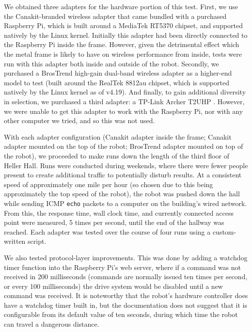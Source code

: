 \documentclass[letterpaper, 11pt]{article}
\begin{document}
We obtained three adapters for the hardware portion of this test. First, we
use the Canakit-branded wireless adapter that came bundled with a purchased
Raspberry Pi\cite{canakit}, which is built around a MediaTek RT5370 chipset,
and supported natively by the Linux kernel. Initially this adapter had been
directly connected to the Raspberry Pi inside the frame. However, given the
detrimental effect which the metal frame is likely to have on wireless 
performance from inside, tests were run with this adapter both inside and
outside of the robot. Secondly, we purchased a BrosTrend high-gain dual-band
wireless adapter as a higher-end model to test\cite{brostrend} (built around
the RealTek 8812au chipset, which is supported natively by the Linux kernel
as of v4.19). And finally, to gain additional diversity in selection, we
purchased a third adapter: a TP-Link Archer T2UHP \cite{archer}. However,
we were unable to get this adapter to work with the Raspberry Pi, nor with
any other computer we tried, and so this was not used.

With each adapter configuration (Canakit adapter inside the frame; Canakit
adapter mounted on the top of the robot; BrosTrend adapter mounted on top
of the robot), we proceeded to make runs down the length of the third
floor of Heller Hall. Runs were conducted during weekends, where there were
fewer people present to create additional traffic to potentially disturb
results. At a consistent speed of approximately one mile per hour (so chosen
due to this being approximately the top speed of the robot), the robot was
pushed down the hall while sending ICMP \texttt{echo} packets to a computer
on the building's wired network. From this, the response time, wall clock
time, and currently connected access point were measured, 5 times per second,
until the end of the hallway was reached. Each adapter was tested over the
course of four runs using a custom-written script\cite{hallway-script}.

We also tested protocol-layer improvements. This was done by adding a
watchdog timer function\cite{watchdog} into the Raspberry Pi's web server,
where if a command was not received in 200 milliseconds (commands are
normally issued ten times per second, or every 100 milliseconds) the drive
system would be disabled until a new command was received. It is noteworthy
that the robot's hardware controller does have a watchdog timer built in, but
the documentation does not suggest that it is configurable from its default
value of ten seconds, during which time the robot can travel a dangerous
distance.
\end{document}
